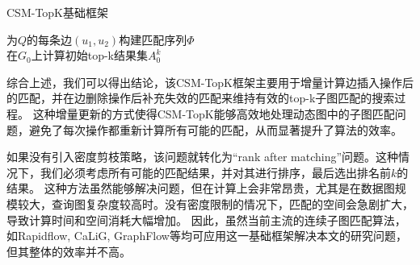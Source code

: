 \begin{algorithm}[h!]
\small
\caption{\label{alg:baseline:framework}CSM-TopK基础框架}
	为$Q$的每条边$(u_1, u_2)$构建匹配序列$\Phi$ \label{code:build-matching-order} \\
	在$G_0$上计算初始top-k结果集$A_0^k$ \label{code:build-initial-topk}\\
\Return
\end{algorithm}

综合上述，我们可以得出结论，该CSM-TopK框架主要用于增量计算边插入操作后的匹配，并在边删除操作后补充失效的匹配来维持有效的top-k子图匹配的搜索过程。
这种增量更新的方式使得CSM-TopK能够高效地处理动态图中的子图匹配问题，避免了每次操作都重新计算所有可能的匹配，从而显著提升了算法的效率。

如果没有引入密度剪枝策略，该问题就转化为“rank after matching”问题。这种情况下，我们必须考虑所有可能的匹配结果，并对其进行排序，最后选出排名前$k$的结果。
这种方法虽然能够解决问题，但在计算上会非常昂贵，尤其是在数据图规模较大，查询图复杂度较高时。没有密度限制的情况下，匹配的空间会急剧扩大，导致计算时间和空间消耗大幅增加。
因此，虽然当前主流的连续子图匹配算法，如Rapidflow\cite{csm-rapidflow-DBLP:journals/pvldb/SunSHL22}, CaLiG\cite{csm-calig-DBLP:journals/pacmmod/YangZZY23}, GraphFlow\cite{csm-graphflow-DBLP:conf/sigmod/KankanamgeSMCS17}等均可应用这一基础框架解决本文的研究问题，但其整体的效率并不高。

